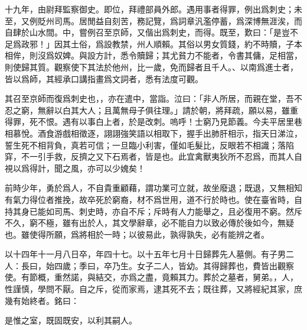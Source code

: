 十九年，由尉拜監察御史。即位，拜禮部員外郎。遇用事者得罪，例出爲刺史；未至，又例貶州司馬。居閒益自刻苦，務記覽，爲詞章汎濫停蓄，爲深博無涯涘，而自肆於山水間。中，嘗例召至京師，又偕出爲刺史，而得。既至，歎曰：「是豈不足爲政邪！」因其土俗，爲設教禁，州人順賴。其俗以男女質錢，約不時贖，子本相侔，則沒爲奴婢。與設方計，悉令贖歸；其尤貧力不能者，令書其傭，足相當，則使歸其質。觀察使下其法於他州，比一歲，免而歸者且千人。、以南爲進士者，皆以爲師，其經承口講指畫爲文詞者，悉有法度可觀。

其召至京師而復爲刺史也，，亦在遣中，當詣。泣曰：「非人所居，而親在堂，吾不忍之窮，無辭以白其大人；且萬無母子俱往理。」請於朝，將拜疏，願以易，雖重得罪，死不恨。遇有以事白上者，於是改刺。嗚呼！士窮乃見節義。今夫平居里巷相慕悅。酒食游戲相徵逐，詡詡強笑語以相取下，握手出肺肝相示，指天日涕泣，誓生死不相背負，真若可信；一旦臨小利害，僅如毛髮比，反眼若不相識；落陷穽，不一引手救，反擠之又下石焉者，皆是也。此宜禽獸夷狄所不忍爲，而其人自視以爲得計，聞之風，亦可以少媿矣！

前時少年，勇於爲人，不自貴重顧藉，謂功業可立就，故坐廢退；既退，又無相知有氣力得位者推挽，故卒死於窮裔，材不爲世用，道不行於時也。使在臺省時，自持其身已能如司馬、刺史時，亦自不斥；斥時有人力能舉之，且必復用不窮。然斥不久，窮不極，雖有出於人，其文學辭章，必不能自力以致必傳於後如今，無疑也。雖使得所願，爲將相於一時；以彼易此，孰得孰失，必有能辨之者。

以十四年十一月八日卒，年四十七。以十五年七月十日歸葬先人墓側。有子男二人：長曰，始四歲；季曰，卒乃生。女子二人，皆幼。其得歸葬也，費皆出觀察使。有節概，重然諾，與結交，亦爲之盡，竟賴其力。葬於之墓者，舅弟。，人，性謹慎，學問不厭。自之斥，從而家焉，逮其死不去；既往葬，又將經紀其家，庶幾有始終者。銘曰：

是惟之室，既固既安，以利其嗣人。

